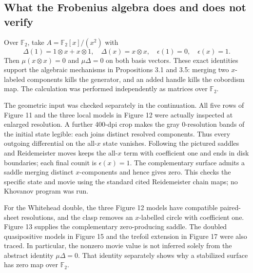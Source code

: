 \documentclass[10pt]{article}
\begin{document}
\subsection*{What the Frobenius algebra does and does not verify}
Over \(\mathbb F_2\), take \(A=\mathbb F_2[x]/(x^2)\) with \[\Delta(1)=1\otimes x+x\otimes1,\quad
 \Delta(x)=x\otimes x,\quad
 \epsilon(1)=0,\quad\epsilon(x)=1.\] Then \(\mu(x\otimes x)=0\) and \(\mu\Delta=0\) on both basis vectors. These exact identities support the algebraic mechanisms in Propositions 3.1 and 3.5: merging two \(x\)-labeled components kills the generator, and an added handle kills the cobordism map. The calculation was performed independently as matrices over \(\mathbb F_2\).\par
The geometric input was checked separately in the continuation. All five rows of Figure 11 and the three local models in Figure 12 were actually inspected at enlarged resolution. A further 400-dpi crop makes the gray \(0\)-resolution bands of the initial state legible: each joins distinct resolved components. Thus every outgoing differential on the all-\(x\) state vanishes. Following the pictured saddles and Reidemeister moves keeps the all-\(x\) term with coefficient one and ends in disk boundaries; each final counit is \(\epsilon(x)=1\). The complementary surface admits a saddle merging distinct \(x\)-components and hence gives zero. This checks the specific state and movie using the standard cited Reidemeister chain maps; no Khovanov program was run.\par
For the Whitehead double, the three Figure 12 models have compatible paired-sheet resolutions, and the clasp removes an \(x\)-labelled circle with coefficient one. Figure 13 supplies the complementary zero-producing saddle. The doubled quasipositive models in Figure 15 and the trefoil extension in Figure 17 were also traced. In particular, the nonzero movie value is not inferred solely from the abstract identity \(\mu\Delta=0\). That identity separately shows why a stabilized surface has zero map over \(\mathbb F_2\).\par
\end{document}
